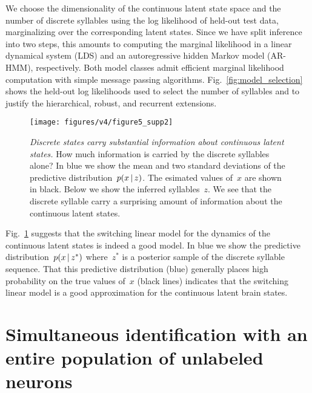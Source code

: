 \documentclass[11pt]{article}
\begin{document}
We choose the dimensionality of the continuous latent state space
and the number of discrete syllables using the log likelihood of
held-out test data, marginalizing over the corresponding latent
states.  Since we have split inference into two steps, this amounts
to computing the marginal likelihood in a linear dynamical system (LDS)
and an autoregressive hidden Markov model (AR-HMM), respectively.
Both model classes admit efficient marginal likelihood computation
with simple message passing algorithms. Fig.~\ref{fig:model_selection}
shows the held-out log likelihoods used to select the number of
syllables and to justify the hierarchical, robust, and recurrent
extensions.


\begin{figure}[t!]
\centering%
\texttt{[image: figures/v4/figure5\_supp2]} 
\caption{\textit{Discrete states carry substantial information about
    continuous latent states.} How much information is carried by the
  discrete syllables alone? In blue we show the mean and two standard deviations of
  the predictive distribution~$p(x \,|\, z)$.  The esimated values of~$x$
  are shown in black. Below we show the inferred syllables~$z$. We see that
  the discrete syllable carry a surprising amount of information about the continuous
  latent states.}
\label{fig:z_predictions}
\end{figure}

Fig.~\ref{fig:z_predictions} suggests that the switching linear model
for the dynamics of the continuous latent states is indeed a good
model.  In blue we show the predictive distribution~$p(x \,|\, z^*)$
where~$z^*$ is a posterior sample of the discrete syllable sequence.
That this predictive distribution (blue) generally places high
probability on the true values of~$x$ (black lines) indicates that the
switching linear model is a good approximation for the continuous
latent brain states.

\clearpage

\section{Simultaneous identification with an entire population of unlabeled neurons}
\end{document}
